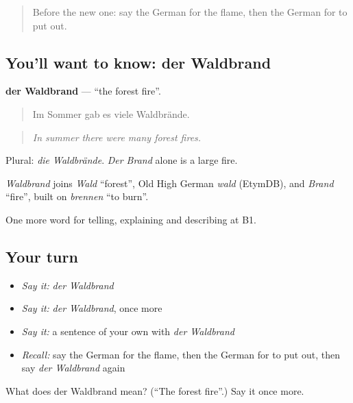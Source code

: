\begin{quote}
Before the new one: say the German for the flame, then the German for to put out.
\end{quote}

\subsection*{You'll want to know: der Waldbrand}
\textbf{der Waldbrand} — \textquotedblleft{}the forest fire\textquotedblright{}.

\begin{quote}
Im Sommer gab es viele Waldbrände.
\end{quote}

\begin{quote}
\emph{In summer there were many forest fires.}
\end{quote}

Plural: \emph{die Waldbrände}. \emph{Der Brand} alone is a large fire.

\begin{cousinweb}
\emph{Waldbrand} joins \emph{Wald} \textquotedblleft{}forest\textquotedblright{}, Old High German \emph{wald} (EtymDB), and \emph{Brand} \textquotedblleft{}fire\textquotedblright{}, built on \emph{brennen} \textquotedblleft{}to burn\textquotedblright{}.
\end{cousinweb}

\begin{grammarlens}[title={What you've built}]
One more word for telling, explaining and describing at B1.
\end{grammarlens}

\subsection*{Your turn}
\begin{itemize}
\raggedright
  \item \emph{Say it:} \emph{der Waldbrand}
  \item \emph{Say it:} \emph{der Waldbrand}, once more
  \item \emph{Say it:} a sentence of your own with \emph{der Waldbrand}
  \item \emph{Recall:} say the German for the flame, then the German for to put out, then say \emph{der Waldbrand} again
\end{itemize}

\begin{tcolorbox}[breakable,colback=teal!4,colframe=teal!35!black,title={Before you move on}]
What does der Waldbrand mean? (\textquotedblleft{}The forest fire\textquotedblright{}.) Say it once more.
\end{tcolorbox}
